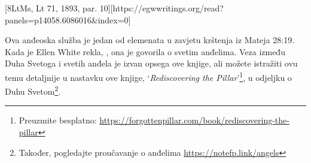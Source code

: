 [8LtMs, Lt 71, 1893, par. 10][https://egwwritings.org/read?panels=p14058.6086016&index=0]

Ova anđeoska služba je jedan od elemenata u zavjetu krštenja iz Mateja 28:19. Kada je Ellen White rekla, , ona je govorila o svetim anđelima. Veza između Duha Svetoga i svetih anđela je izvan opsega ove knjige, ali možete istražiti ovu temu detaljnije u nastavku ove knjige, ‘\textit{Rediscovering the Pillar}’\footnote{Preuzmite besplatno: \href{https://forgottenpillar.com/book/rediscovering-the-pillar}{https://forgottenpillar.com/book/rediscovering-the-pillar}}, u odjeljku o Duhu Svetom\footnote{Također, pogledajte proučavanje o anđelima \href{https://notefp.link/angels}{https://notefp.link/angels}}.

